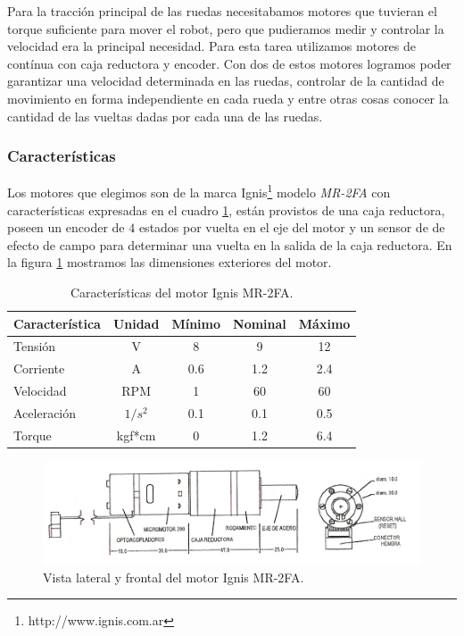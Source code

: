 Para la tracci\'on principal de las ruedas necesitabamos motores que tuvieran el torque suficiente para mover el robot, pero que pudieramos medir y
controlar la velocidad era la principal necesidad. Para esta tarea utilizamos motores de cont\'inua con caja reductora y encoder.
Con dos de estos motores logramos poder garantizar una velocidad determinada en las ruedas, controlar de la cantidad de movimiento en forma
independiente en cada rueda y entre otras cosas conocer la cantidad de las vueltas dadas por cada una de las ruedas.

\subsubsection{Caracter\'isticas}
\label{h_actuadores_motorDC_caracteristicas}

Los motores que elegimos son de la marca Ignis\footnote{http://www.ignis.com.ar} modelo \emph{MR-2FA} con caracter\'isticas expresadas en el cuadro
\ref{hT_motorDC}, est\'an provistos de una caja reductora, poseen un encoder de $4$ estados por vuelta en el eje del motor y un sensor de de efecto
de campo para determinar una vuelta en la salida de la caja reductora.
En la figura \ref{hF_motorDC} mostramos las dimensiones exteriores del motor.

\begin{table}
	\begin{center}
		\begin{tabular}{|l|c|c|c|c|}
			\hline
			Caracter\'istica & Unidad & M\'inimo & Nominal & M\'aximo \\
			\hline
			Tensi\'on & V & 8 & 9 & 12 \\
			Corriente & A & 0.6 & 1.2 & 2.4 \\
			Velocidad & RPM & 1 & 60 & 60 \\
			Aceleraci\'on & $1/s^{2}$ & 0.1 & 0.1 & 0.5 \\
			Torque & kgf*cm & 0 & 1.2 & 6.4 \\
			\hline
		\end{tabular}
	\end{center}
	\caption{Caracter\'isticas del motor Ignis MR-2FA.}
	\label{hT_motorDC}
\end{table}

\begin{figure}[ht]
	\centering
	\includegraphics[scale=1]{MR2-FA.png}
	\caption{Vista lateral y frontal del motor Ignis MR-2FA.}
	\label{hF_motorDC}
\end{figure}

